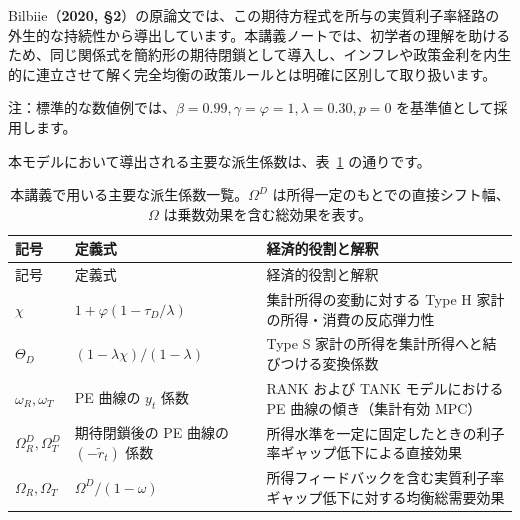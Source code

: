 \documentclass[
  japanese,
  lualatex,
  ja=standard,
  12pt,
  a4paper]{ltjsarticle}
\begin{document}
Bilbiie（\textbf{2020,
§2}）の原論文では、この期待方程式を所与の実質利子率経路の外生的な持続性から導出しています。本講義ノートでは、初学者の理解を助けるため、同じ関係式を簡約形の期待閉鎖として導入し、インフレや政策金利を内生的に連立させて解く完全均衡の政策ルールとは明確に区別して取り扱います。

注：標準的な数値例では、\(\beta=0.99, \gamma=\varphi=1, \lambda=0.30, p=0\)
を基準値として採用します。

本モデルにおいて導出される主要な派生係数は、表~\ref{tbl-lecture12-derived-coefficients}
の通りです。

\begin{longtable}[]{@{}
  >{\raggedright\arraybackslash}p{}
  >{\raggedright\arraybackslash}p{}
  >{\raggedright\arraybackslash}p{}@{}}
\caption{本講義で用いる主要な派生係数一覧。\(\Omega^D\)
は所得一定のもとでの直接シフト幅、\(\Omega\)
は乗数効果を含む総効果を表す。}\label{tbl-lecture12-derived-coefficients}\tabularnewline
\toprule\noalign{}
\begin{minipage}[b]{\linewidth}\raggedright
記号
\end{minipage} & \begin{minipage}[b]{\linewidth}\raggedright
定義式
\end{minipage} & \begin{minipage}[b]{\linewidth}\raggedright
経済的役割と解釈
\end{minipage} \\
\midrule\noalign{}
\endfirsthead
\toprule\noalign{}
\begin{minipage}[b]{\linewidth}\raggedright
記号
\end{minipage} & \begin{minipage}[b]{\linewidth}\raggedright
定義式
\end{minipage} & \begin{minipage}[b]{\linewidth}\raggedright
経済的役割と解釈
\end{minipage} \\
\midrule\noalign{}
\endhead
\bottomrule\noalign{}
\endlastfoot
\(\chi\) & \(1 + \varphi(1 - \tau_D/\lambda)\) & 集計所得の変動に対する
Type H 家計の所得・消費の反応弾力性 \\
\(\Theta_D\) & \((1 - \lambda\chi)/(1-\lambda)\) & Type S
家計の所得を集計所得へと結びつける変換係数 \\
\(\omega_R, \omega_T\) & PE 曲線の \(y_t\) 係数 & RANK および TANK
モデルにおける PE 曲線の傾き（集計有効 MPC） \\
\(\Omega_R^D, \Omega_T^D\) & 期待閉鎖後の PE 曲線の
\((-\widetilde{r}_t)\) 係数 &
所得水準を一定に固定したときの利子率ギャップ低下による直接効果 \\
\(\Omega_R, \Omega_T\) & \(\Omega^D / (1-\omega)\) &
所得フィードバックを含む実質利子率ギャップ低下に対する均衡総需要効果 \\
\end{longtable}
\end{document}
